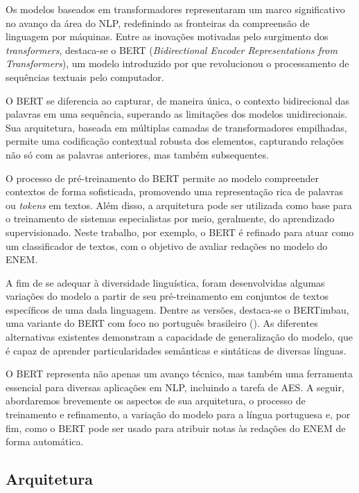 Os modelos baseados em transformadores representaram um marco significativo no avanço da área do NLP, redefinindo as fronteiras da compreensão de linguagem por máquinas. Entre as inovações motivadas pelo surgimento dos \textit{transformers}, destaca-se o BERT (\textit{Bidirectional Encoder Representations from Transformers}), um modelo introduzido por \citet{bert2018} que revolucionou o processamento de sequências textuais pelo computador.

O BERT se diferencia ao capturar, de maneira única, o contexto bidirecional das palavras em uma sequência, superando as limitações dos modelos unidirecionais. Sua arquitetura, baseada em múltiplas camadas de transformadores empilhadas, permite uma codificação contextual robusta dos elementos, capturando relações não só com as palavras anteriores, mas também subsequentes.

O processo de pré-treinamento do BERT permite ao modelo compreender contextos de forma sofisticada, promovendo uma representação rica de palavras ou \textit{tokens} em textos. Além disso, a arquitetura pode ser utilizada como base para o treinamento de sistemas especialistas por meio, geralmente, do aprendizado supervisionado. Neste trabalho, por exemplo, o BERT é refinado para atuar como um classificador de textos, com o objetivo de avaliar redações no modelo do ENEM.

A fim de se adequar à diversidade linguística, foram desenvolvidas algumas variações do modelo a partir de seu pré-treinamento em conjuntos de textos específicos de uma dada linguagem. Dentre as versões, destaca-se o BERTimbau, uma variante do BERT com foco no português brasileiro (\cite{bertimbau2020}). As diferentes alternativas existentes demonstram a capacidade de generalização do modelo, que é capaz de aprender particularidades semânticas e sintáticas de diversas línguas.

O BERT representa não apenas um avanço técnico, mas também uma ferramenta essencial para diversas aplicações em NLP, incluindo a tarefa de AES. A seguir, abordaremos brevemente os aspectos de sua arquitetura, o processo de treinamento e refinamento, a variação do modelo para a língua portuguesa e, por fim, como o BERT pode ser usado para atribuir notas às redações do ENEM de forma automática.

\subsection{Arquitetura}
\label{subsec:bert_architecture}

